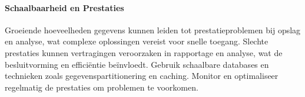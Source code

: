 \paragraph{Schaalbaarheid en Prestaties}
Groeiende hoeveelheden gegevens kunnen leiden tot prestatieproblemen bij opslag en analyse, wat complexe oplossingen vereist voor snelle toegang. Slechte prestaties kunnen vertragingen veroorzaken in rapportage en analyse, wat de besluitvorming en efficiëntie beïnvloedt. Gebruik schaalbare databases en technieken zoals gegevenspartitionering en caching. Monitor en optimaliseer regelmatig de prestaties om problemen te voorkomen.



